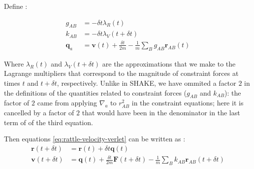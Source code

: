 \par Define \cite{Rattle}:
\begin{tcolorbox}
\begin{equation}
\label{eq:rattle-definitions}
\begin{aligned}	
	g_{AB} &= - \delta t \lambda_{R}(t)					\\
	k_{AB} &= - \delta t \lambda_{V}(t + \delta t)		\\
	\mathbf{q}_a &= \mathbf{v}(t) + \frac{\delta t}{2 m} - \frac{1}{m} \sum_{B} g_{AB} \mathbf{r}_{AB}(t)
\end{aligned}
\end{equation}
\end{tcolorbox}
\par Where $\lambda_{R}(t)$ and $\lambda_{V}(t + \delta t)$ are the approximations that we make to the Lagrange multipliers that correspond to the magnitude of constraint forces at times $t$ and $t + \delta t$, respectively. Unlike in SHAKE, we have ommited a factor $2$ in the definitions of the quantities related to constraint forces ($g_{AB}$ and $k_{AB}$): the factor of $2$ came from applying $\nabla_{a}$ to $r^2_{AB}$ in the constraint equations; here it is cancelled by a factor of $2$ that would have been in the denominator in the last term of of the third equation.
\par Then equations \ref{eq:rattle-velocity-verlet} can be written as \cite{Rattle}:
\begin{equation*}
\begin{aligned}
	\mathbf{r}(t + \delta t) &= \mathbf{r}(t) + \delta t \mathbf{q}(t)	\\
	\mathbf{v}(t + \delta t) &= \mathbf{q}(t) + \frac{\delta t}{2 m} \mathbf{F}(t + \delta t) - \frac{1}{m} \sum_{B} k_{AB} \mathbf{r}_{AB} (t + \delta t)
\end{aligned}
\end{equation*}